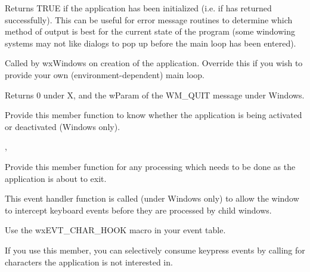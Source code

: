 
Returns TRUE if the application has been initialized (i.e. if\rtfsp
{} has returned successfully).  This can be useful for error
message routines to determine which method of output is best for the
current state of the program (some windowing systems may not like
dialogs to pop up before the main loop has been entered).

\label{wxappmainloop}


Called by wxWindows on creation of the application. Override this if you wish
to provide your own (environment-dependent) main loop.


Returns 0 under X, and the wParam of the WM\_QUIT message under Windows.

\label{wxapponactivate}


Provide this member function to know whether the application is being
activated or deactivated (Windows only).


, 

\label{wxapponexit}


Provide this member function for any processing which needs to be done as
the application is about to exit.

\label{wxapponcharhook}


This event handler function is called (under Windows only) to allow the window to intercept keyboard events
before they are processed by child windows.




Use the wxEVT\_CHAR\_HOOK macro in your event table.

If you use this member, you can selectively consume keypress events by calling\rtfsp
{} for characters the application is not interested in.

